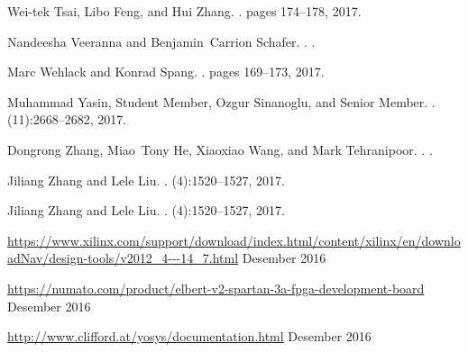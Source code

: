 \begin{thebibliography}{10}
Wei-tek Tsai, Libo Feng, and Hui Zhang.
.
\newblock pages 174--178, 2017.

Nandeesha Veeranna and Benjamin~Carrion Schafer.
.
.

Marc Wehlack and Konrad Spang.
.
\newblock pages 169--173, 2017.

Muhammad Yasin, Student Member, Ozgur Sinanoglu, and Senior Member.
.
(11):2668--2682, 2017.

Dongrong Zhang, Miao~Tony He, Xiaoxiao Wang, and Mark Tehranipoor.
.
.

Jiliang Zhang and Lele Liu.
.
(4):1520--1527, 2017.

Jiliang Zhang and Lele Liu.
.
(4):1520--1527, 2017.

	\url{https://www.xilinx.com/support/download/index.html/content/xilinx/en/downloadNav/design-tools/v2012_4---14_7.html}
 Desember 2016

	\url{https://numato.com/product/elbert-v2-spartan-3a-fpga-development-board}
 Desember 2016

	\url{http://www.clifford.at/yosys/documentation.html}
 Desember 2016

\end{thebibliography}